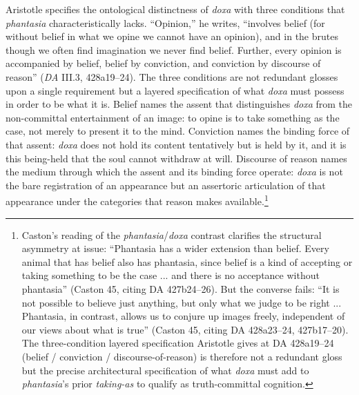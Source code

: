 Aristotle specifies the ontological distinctness of \textit{doxa} with three conditions that \textit{phantasia} characteristically lacks. ``Opinion,'' he writes, ``involves belief (for without belief in what we opine we cannot have an opinion), and in the brutes though we often find imagination we never find belief. Further, every opinion is accompanied by belief, belief by conviction, and conviction by discourse of reason'' (\textit{DA} III.3, 428a19--24). The three conditions are not redundant glosses upon a single requirement but a layered specification of what \textit{doxa} must possess in order to be what it is. Belief names the assent that distinguishes \textit{doxa} from the non-committal entertainment of an image: to opine is to take something as the case, not merely to present it to the mind. Conviction names the binding force of that assent: \textit{doxa} does not hold its content tentatively but is held by it, and it is this being-held that the soul cannot withdraw at will. Discourse of reason names the medium through which the assent and its binding force operate: \textit{doxa} is not the bare registration of an appearance but an assertoric articulation of that appearance under the categories that reason makes available.\footnote{Caston's reading of the \textit{phantasia}/\textit{doxa} contrast clarifies the structural asymmetry at issue: ``Phantasia has a wider extension than belief. Every animal that has belief also has phantasia, since belief is a kind of accepting or taking something to be the case ... and there is no acceptance without phantasia'' (Caston 45, citing DA 427b24--26). But the converse fails: ``It is not possible to believe just anything, but only what we judge to be right ... Phantasia, in contrast, allows us to conjure up images freely, independent of our views about what is true'' (Caston 45, citing DA 428a23--24, 427b17--20). The three-condition layered specification Aristotle gives at DA 428a19--24 (belief / conviction / discourse-of-reason) is therefore not a redundant gloss but the precise architectural specification of what \textit{doxa} must add to \textit{phantasia}'s prior \textit{taking-as} to qualify as truth-committal cognition.}


